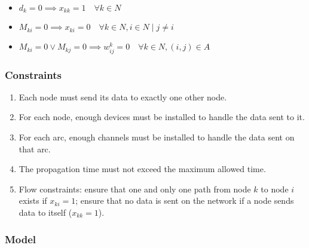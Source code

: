 \begin{itemize}
	\item $d_k = 0 \implies x_{kk} = 1 \quad \forall k \in N$
	\item $M_{ki} = 0 \implies x_{ki} = 0 \quad \forall k \in N, i \in N \mid j \ne i$
	\item $M_{ki} = 0 \vee M_{kj} = 0 \implies w_{ij}^k = 0 \quad \forall k \in N, (i, j) \in A$
\end{itemize}

\subsubsection*{Constraints}

\begin{enumerate}
	\item Each node must send its data to exactly one other node.
	\item For each node, enough devices must be installed to handle the data sent to it.
	\item For each arc, enough channels must be installed to handle the data sent on that arc.
	\item The propagation time must not exceed the maximum allowed time.
	\item Flow constraints: ensure that one and only one path from node $k$ to node $i$ exists if $x_{ki} = 1$; ensure that no data is sent on the network if a node sends data to itself ($x_{kk} = 1$).
\end{enumerate}

\subsubsection*{Model}

